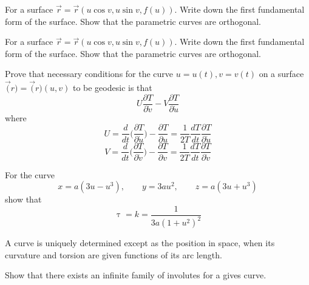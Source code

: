 \documentclass[11pt,paper=a4,answers]{exam}
\begin{document}
		
\begin{questions}
			
\pointsinrightmargin
\pointsdroppedatright
\marksnotpoints
\pointformat{\boldmath\themarginpoints}
\bracketedpoints
			
			
			\question[06]
			\label{Q:perunit}
			For a surface $\vec{r}= \vec{r} (u \cos v, u \sin v, f(u))$. Write down the first fundamental form of the surface. Show that the parametric curves are orthogonal.
			\droppoints
			
			\question[06]
			\label{Q:perunit}
			For a surface $\vec{r}= \vec{r} (u \cos v, u \sin v, f(u))$. Write down the first fundamental form of the surface. Show that the parametric curves are orthogonal.
			\droppoints
			
						
			\question[10]
			\label{Q:zbus}
			Prove that necessary conditions for the curve $u = u(t), v = v(t)$ on a surface $\vec(r) = \vec(r)(u,v)$ to be geodesic is that \begin{equation}U \frac{\partial T}{\partial \dot{v}} - V    \frac{\partial T}{\partial \dot{u}}\end{equation}
			where
			$$ U = \frac{d}{dt} \Big(\frac{\partial T}{\partial \dot{u}}\Big) - \frac{\partial T}{\partial u} = \frac{1}{2T}\frac{dT}{dt}\frac{\partial T}{\partial \dot{u}}$$
			$$ V = \frac{d}{dt} \Big(\frac{\partial T}{\partial    \dot{v}}\Big) - \frac{\partial T}{\partial v} = \frac{1}{2T}\frac{dT}{dt}\frac{\partial T}{\partial \dot{v}}$$
			\droppoints
			
			
			
			
			
			
			
			\question[8]
			\label{Q:zbus}
			For the curve
			$$
			x = a(3u - u^{3}),\qquad y = 3au^{2},\qquad z = a(3u + u^{3})
			$$
			show that $$\uptau = k  =  \frac{1}{3a(1+u^{2})^{2}}$$
			\droppoints
			
			
			
			
			
			
			
			\question[8]
			\label{Q:zbus}
			A curve is uniquely determined except as the position in space, when its curvature and            torsion are given functions of its arc length.
			\droppoints
			
			
			
			\question[8]
			\label{Q:zbus}
			Show that there exists an infinite family of involutes for a  gives curve.
			\droppoints
			\newpage
			

\end{questions}
\end{document}

